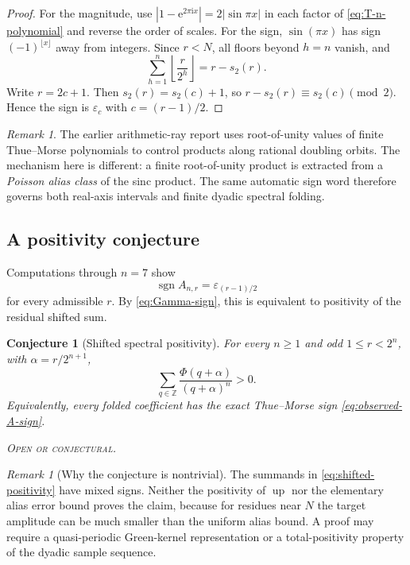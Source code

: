 \documentclass[11pt,oneside]{article}
\newtheorem{conjecture}[theorem]{Conjecture}
\theoremstyle{definition}
\theoremstyle{remark}
\newtheorem{remark}[theorem]{Remark}
\newcommand{\Z}{\mathbb Z}
\newcommand{\Up}{\operatorname{up}}
\newcommand{\e}{\mathrm e}
\newcommand{\ii}{\mathrm i}
\newcommand{\eps}{\varepsilon}
\newcommand{\PhiU}{\Phi}
\newcommand{\openstatus}{\textcolor{conjectureorange}{\textsc{Open or conjectural.}}}
\begin{document}
\begin{proof}
For the magnitude, use $|1-\e^{2\pi\ii x}|=2|\sin\pi x|$ in each factor of
\eqref{eq:T-n-polynomial} and reverse the order of scales.  For the sign,
$\sin(\pi x)$ has sign $(-1)^{\lfloor x\rfloor}$ away from integers.  Since
$r<N$, all floors beyond $h=n$ vanish, and
\[
 \sum_{h=1}^{n}\left\lfloor\frac r{2^h}\right\rfloor
 =r-s_2(r).
\]
Write $r=2c+1$.  Then $s_2(r)=s_2(c)+1$, so
$r-s_2(r)\equiv s_2(c)\pmod2$.  Hence the sign is $\eps_c$ with
$c=(r-1)/2$.
\end{proof}

\begin{remark}
The earlier arithmetic-ray report uses root-of-unity values of finite
Thue--Morse polynomials to control products along rational doubling orbits.  The
mechanism here is different: a finite root-of-unity product is extracted from a
\emph{Poisson alias class} of the sinc product.  The same automatic sign word
therefore governs both real-axis intervals and finite dyadic spectral folding.
\end{remark}

\subsection{A positivity conjecture}

Computations through $n=7$ show
\begin{equation}\label{eq:observed-A-sign}
 \operatorname{sgn}A_{n,r}=\eps_{(r-1)/2}
\end{equation}
for every admissible $r$.  By \eqref{eq:Gamma-sign}, this is equivalent to
positivity of the residual shifted sum.

\begin{conjecture}[Shifted spectral positivity]\label{conj:shifted-positivity}
For every $n\ge1$ and odd $1\le r<2^n$, with
$\alpha=r/2^{n+1}$,
\begin{equation}\label{eq:shifted-positivity}
 \boxed{
 \sum_{q\in\Z}\frac{\PhiU(q+\alpha)}{(q+\alpha)^n}>0.}
\end{equation}
Equivalently, every folded coefficient has the exact Thue--Morse sign
\eqref{eq:observed-A-sign}.

\smallskip\noindent\openstatus
\end{conjecture}

\begin{remark}[Why the conjecture is nontrivial]
The summands in \eqref{eq:shifted-positivity} have mixed signs.  Neither the
positivity of $\Up$ nor the elementary alias error bound proves the claim,
because for residues near $N$ the target amplitude can be much smaller than the
uniform alias bound.  A proof may require a quasi-periodic Green-kernel
representation or a total-positivity property of the dyadic sample sequence.
\end{remark}
\end{document}
